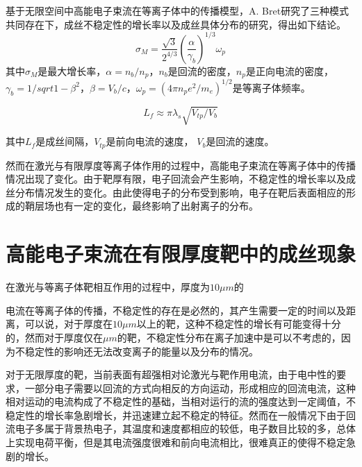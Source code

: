 基于无限空间中高能电子束流在等离子体中的传播模型，A. Bret\cite{bret2005characterization,bret2004collective}研究了三种模式共同存在下，成丝不稳定性的增长率以及成丝具体分布的研究，得出如下结论。
\begin{equation}
\label{eqn:maxGrowth}
{\sigma}_M= \frac{\sqrt{3}}{2^{4/3}}(\frac{\alpha}{{\gamma}_b})^{1/3} {\omega}_p
\end{equation} 
其中${\sigma}_M$是最大增长率，$\alpha=n_b/n_p$，$n_b$是回流的密度，$n_p$是正向电流的密度，${\gamma}_b=1/sqrt{1-{\beta}^2}$，$\beta=V_b/c$，${\omega}_p=(4 \pi n_p e^2/m_e)^{1/2} $是等离子体频率。

\begin{equation}
\label{eqn:filamentSpace}
L_f \approx \pi {\lambda}_s \sqrt{V_{tp}/V_b}
\end{equation} 

其中$L_f$是成丝间隔，$V_{tp}$是前向电流的速度， $V_b$是回流的速度。


然而在激光与有限厚度等离子体作用的过程中，高能电子束流在等离子体中的传播情况出现了变化。由于靶厚有限，电子回流会产生影响，不稳定性的增长率以及成丝分布情况发生的变化。由此使得电子的分布受到影响，电子在靶后表面相应的形成的鞘层场也有一定的变化，最终影响了出射离子的分布。




\section{高能电子束流在有限厚度靶中的成丝现象}

在激光与等离子体靶相互作用的过程中，厚度为$10\mu m$的

电流在等离子体的传播，不稳定性的存在是必然的，其产生需要一定的时间以及距离，可以说，对于厚度在$10\mu m$以上的靶，这种不稳定性的增长有可能变得十分的，然而对于厚度仅在$\mu m$的靶，不稳定性分布在离子加速中是可以不考虑的，因为不稳定性的影响还无法改变离子的能量以及分布的情况。


对于无限厚度的靶，当前表面有超强相对论激光与靶作用电流，由于电中性的要求，一部分电子需要以回流的方式向相反的方向运动，形成相应的回流电流，这种相对运动的电流构成了不稳定性的基础，当相对运行的流的强度达到一定阈值，不稳定性的增长率急剧增长，并迅速建立起不稳定的特征。然而在一般情况下由于回流电子多属于背景热电子，其温度和速度都相应的较低，电子数目比较的多，总体上实现电荷平衡，但是其电流强度很难和前向电流相比，很难真正的使得不稳定急剧的增长。






